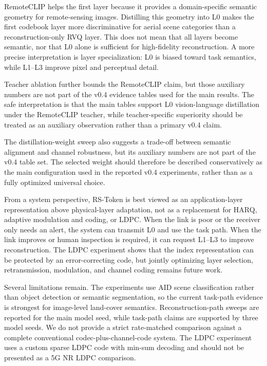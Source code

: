 \documentclass[lettersize,journal]{IEEEtran}
\begin{document}
RemoteCLIP helps the first layer because it provides a domain-specific semantic geometry for remote-sensing images. Distilling this geometry into L0 makes the first codebook layer more discriminative for aerial scene categories than a reconstruction-only RVQ layer. This does not mean that all layers become semantic, nor that L0 alone is sufficient for high-fidelity reconstruction. A more precise interpretation is layer specialization: L0 is biased toward task semantics, while L1--L3 improve pixel and perceptual detail.

Teacher ablation further bounds the RemoteCLIP claim, but those auxiliary numbers are not part of the v0.4 evidence tables used for the main results. The safe interpretation is that the main tables support L0 vision-language distillation under the RemoteCLIP teacher, while teacher-specific superiority should be treated as an auxiliary observation rather than a primary v0.4 claim.

The distillation-weight sweep also suggests a trade-off between semantic alignment and channel robustness, but its auxiliary numbers are not part of the v0.4 table set. The selected weight should therefore be described conservatively as the main configuration used in the reported v0.4 experiments, rather than as a fully optimized universal choice.

From a system perspective, RS-Token is best viewed as an application-layer representation above physical-layer adaptation, not as a replacement for HARQ, adaptive modulation and coding, or LDPC. When the link is poor or the receiver only needs an alert, the system can transmit L0 and use the task path. When the link improves or human inspection is required, it can request L1--L3 to improve reconstruction. The LDPC experiment shows that the index representation can be protected by an error-correcting code, but jointly optimizing layer selection, retransmission, modulation, and channel coding remains future work.

Several limitations remain. The experiments use AID scene classification rather than object detection or semantic segmentation, so the current task-path evidence is strongest for image-level land-cover semantics. Reconstruction-path sweeps are reported for the main model seed, while task-path claims are supported by three model seeds. We do not provide a strict rate-matched comparison against a complete conventional codec-plus-channel-code system. The LDPC experiment uses a custom sparse LDPC code with min-sum decoding and should not be presented as a 5G NR LDPC comparison.
\end{document}
